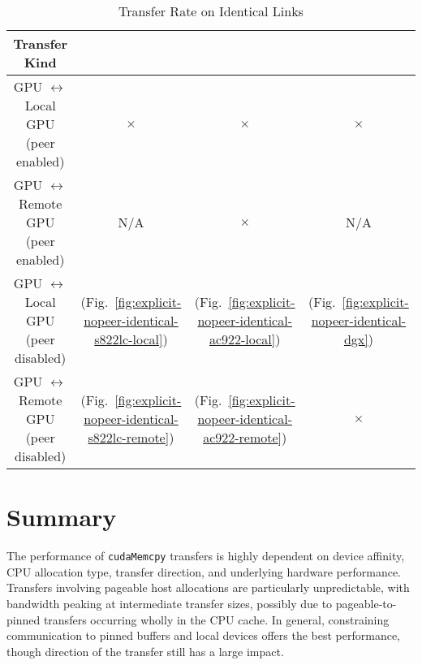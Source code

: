 \begin{table}[ht]
	\centering
	\caption[Transfer rate on Identical Links]{Transfer Rate on Identical Links}
	\label{tab:explicit}
	\begin{tabular}{cccc}
		\hline
		\textbf{Transfer Kind}                      \\ \hline 
		\makecell{ GPU $\leftrightarrow$ Local GPU  \\ (peer enabled)  } & $\times$                                                            & $\times$                                                           & $\times$                                                  \\ \hline
		\makecell{ GPU $\leftrightarrow$ Remote GPU \\ (peer enabled)  } & N/A                                                                 & $\times$                                                           & N/A                                                       \\ \hline
		\makecell{ GPU $\leftrightarrow$ Local GPU  \\ (peer disabled) } & \checkmark (Fig.~\ref{fig:explicit-nopeer-identical-s822lc-local})  & \checkmark (Fig.~\ref{fig:explicit-nopeer-identical-ac922-local})  & \checkmark (Fig.~\ref{fig:explicit-nopeer-identical-dgx}) \\ \hline
		\makecell{ GPU $\leftrightarrow$ Remote GPU \\ (peer disabled) } & \checkmark (Fig.~\ref{fig:explicit-nopeer-identical-s822lc-remote}) & \checkmark (Fig.~\ref{fig:explicit-nopeer-identical-ac922-remote}) & $\times$                                                  \\ \hline
	\end{tabular}
\end{table}

\section{Summary}

The performance of \texttt{cudaMemcpy} transfers is highly dependent on device affinity, CPU allocation type, transfer direction, and underlying hardware performance.
Transfers involving pageable host allocations are particularly unpredictable, with bandwidth peaking at intermediate transfer sizes, possibly due to pageable-to-pinned transfers occurring wholly in the CPU cache.
In general, constraining communication to pinned buffers and local devices offers the best performance, though direction of the transfer still has a large impact.
